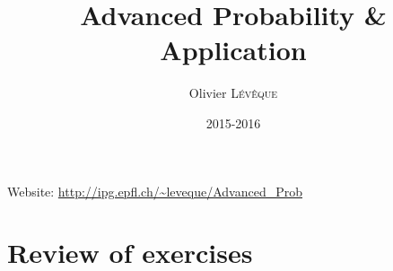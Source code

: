 

\title{Advanced Probability \& Application}
\author{Olivier \textsc{Lévêque}}
\date{2015-2016}


\maketitle
\tableofcontents

\newpage

Website: \url{http://ipg.epfl.ch/~leveque/Advanced_Prob}

\chapter{Review of exercises}
    



\nocite{*}







